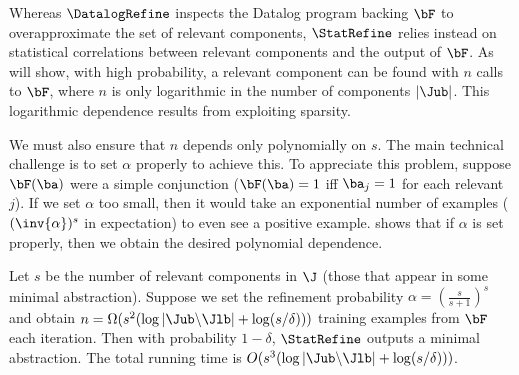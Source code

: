 Whereas $\DatalogRefine$ inspects the Datalog program backing $\bF$ to
overapproximate the set of relevant components, $\StatRefine$ relies instead on
statistical correlations between relevant components and the output of $\bF$.
As  will show, with high probability,
a relevant component can be found with $n$ calls to $\bF$, where $n$ is
only logarithmic in the number of components $|\Jub|$.
This logarithmic dependence results from exploiting sparsity.

We must also ensure that $n$ depends only polynomially on $s$.
The main technical challenge is to set $\alpha$ properly to achieve this.
To appreciate this problem,
suppose $\bF(\ba)$ were a simple conjunction ($\bF(\ba) = 1$ iff $\ba_j = 1$ for each relevant $j$).
If we set $\alpha$ too small, then it would take an exponential number of examples ($(\inv{\alpha})^s$ in expectation)
to even see a positive example.
 shows that if $\alpha$ is set properly, then we obtain the desired polynomial dependence.

\begin{theorem}
\label{thm:statRefine}
Let $s$ be the number of relevant components in $\J$ (those that appear in some minimal abstraction).
Suppose we set the refinement probability $\alpha = (\frac{s}{s+1})^s$ 
and obtain $n = \Omega(s^2 (\log |\Jub \backslash \Jlb| + \log (s/\delta)))$ training examples from $\bF$ each iteration.
Then with probability $1-\delta$,
$\StatRefine$ outputs a minimal abstraction.
The total running time is $O(s^3 (\log |\Jub \backslash \Jlb| + \log
(s/\delta)))$.
\end{theorem}

